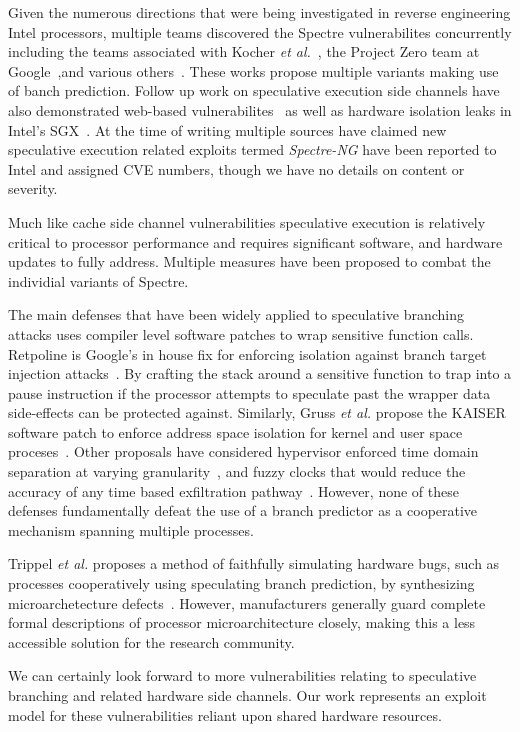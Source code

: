Given the numerous directions that were being investigated in reverse engineering 
Intel processors, multiple teams discovered the Spectre vulnerabilites concurrently including 
the teams associated with Kocher \textit{et al.}~\cite{spectre}, the Project Zero team 
at Google~\cite{project_zero},and various others~\cite{evtyushkin2018branchscope,maisuradze2018speculose}. 
These works propose multiple variants making use of banch prediction.  Follow 
up work on speculative execution side channels have also demonstrated
web-based vulnerabilites~\cite{genkin2018drive} as well as hardware isolation  
leaks in Intel's SGX~\cite{spectre_sgx}. At the time of writing multiple sources
have claimed new speculative execution related exploits termed \textit{Spectre-NG}
have been reported to Intel and assigned CVE numbers, though we have no details
on content or severity.  


Much like cache side channel vulnerabilities speculative execution is relatively
critical to processor performance and requires significant software, and hardware 
updates to fully address. Multiple measures have been proposed to combat the 
individial variants of Spectre.   

The main defenses that have been widely applied to 
speculative branching attacks uses compiler level software patches to wrap sensitive 
function calls. Retpoline is Google's in house fix for enforcing 
isolation against branch target injection attacks~\cite{retpoline}. By crafting 
the stack around a sensitive function to trap into a pause instruction if the processor 
attempts to speculate past the wrapper data side-effects can be protected against. 
Similarly, Gruss \textit{et al.} propose the KAISER software patch to enforce address space
isolation for kernel and user space proceses~\cite{gruss2017kaslr}. 
Other proposals have considered hypervisor enforced time domain separation at varying 
granularity~\cite{renau2018securing}, and fuzzy clocks that would reduce the accuracy 
of any time based exfiltration pathway~\cite{hu1992reducing}. However, none of these defenses 
fundamentally defeat the use of a branch predictor as a cooperative mechanism
spanning multiple processes. 

Trippel \textit{et al.} proposes a method of faithfully simulating 
hardware bugs, such as processes cooperatively using speculating branch prediction,
by synthesizing microarchetecture defects~\cite{trippel2018meltdownprime}. However, 
manufacturers generally guard complete formal descriptions of processor microarchitecture closely, 
making this a less accessible solution for the research community.

\smallskip

We can certainly look forward to more vulnerabilities relating to speculative 
branching and related hardware side channels. Our work represents an exploit 
model for these vulnerabilities reliant upon shared hardware resources. 



